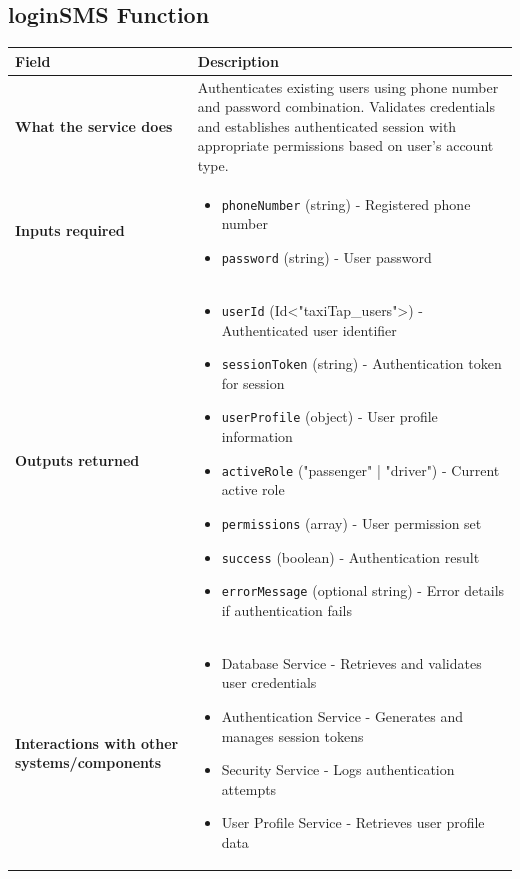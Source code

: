 \documentclass[11pt,a4paper]{article}
\begin{document}
\subsection{loginSMS Function}

\begin{longtable}{|p{4cm}|p{12cm}|}
\hline
\textbf{Field} & \textbf{Description} \\
\hline
\textbf{What the service does} & 
Authenticates existing users using phone number and password combination. Validates credentials and establishes authenticated session with appropriate permissions based on user's account type. \\
\hline
\textbf{Inputs required} & 
\begin{itemize}[nosep]
\item \texttt{phoneNumber} (string) - Registered phone number
\item \texttt{password} (string) - User password
\end{itemize} \\
\hline
\textbf{Outputs returned} & 
\begin{itemize}[nosep]
\item \texttt{userId} (Id<"taxiTap\_users">) - Authenticated user identifier
\item \texttt{sessionToken} (string) - Authentication token for session
\item \texttt{userProfile} (object) - User profile information
\item \texttt{activeRole} ("passenger" | "driver") - Current active role
\item \texttt{permissions} (array) - User permission set
\item \texttt{success} (boolean) - Authentication result
\item \texttt{errorMessage} (optional string) - Error details if authentication fails
\end{itemize} \\
\hline
\textbf{Interactions with other systems/components} & 
\begin{itemize}[nosep]
\item Database Service - Retrieves and validates user credentials
\item Authentication Service - Generates and manages session tokens
\item Security Service - Logs authentication attempts
\item User Profile Service - Retrieves user profile data
\end{itemize} \\
\hline
\end{longtable}
\end{document}
